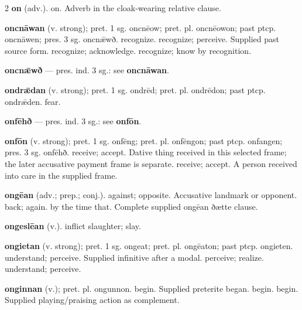 \begin{multicols*}{2}
\textbf{on} (adv.). on. Adverb in the cloak-wearing relative clause.\par
\textbf{oncnāwan} (v. strong); pret. 1 sg. oncnēow; pret. pl. oncnēowon; past ptcp. oncnāwen; pres. 3 sg. oncnǣwð. recognize. recognize; perceive. Supplied past source form. recognize; acknowledge. recognize; know by recognition.\par
\textbf{oncnǣwð} — pres. ind. 3 sg.: see \textbf{oncnāwan}.\par
\textbf{ondrǣdan} (v. strong); pret. 1 sg. ondrēd; pret. pl. ondrēdon; past ptcp. ondrǣden. fear.\par
\textbf{onfēhð} — pres. ind. 3 sg.: see \textbf{onfōn}.\par
\textbf{onfōn} (v. strong); pret. 1 sg. onfēng; pret. pl. onfēngon; past ptcp. onfangen; pres. 3 sg. onfēhð. receive; accept. Dative thing received in this selected frame; the later accusative payment frame is separate. receive; accept. A person received into care in the supplied frame.\par
\textbf{ongēan} (adv.; prep.; conj.). against; opposite. Accusative landmark or opponent. back; again. by the time that. Complete supplied ongēan ðætte clause.\par
\textbf{ongeslēan} (v.). inflict slaughter; slay.\par
\textbf{ongietan} (v. strong); pret. 1 sg. ongeat; pret. pl. ongēaton; past ptcp. ongieten. understand; perceive. Supplied infinitive after a modal. perceive; realize. understand; perceive.\par
\textbf{onginnan} (v.); pret. pl. ongunnon. begin. Supplied preterite began. begin. begin. Supplied playing/praising action as complement.\par

\end{multicols*}
